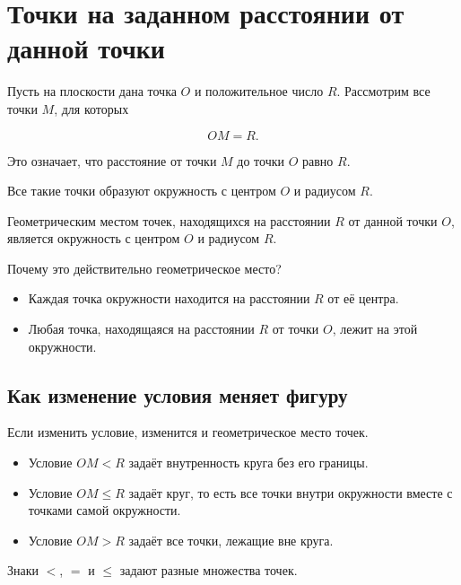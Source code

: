 	\section{Точки на заданном расстоянии от данной точки}
	
	Пусть на плоскости дана точка \(O\) и положительное число \(R\).
	Рассмотрим все точки \(M\), для которых
	
	\[
	OM=R.
	\]
	
	Это означает, что расстояние от точки \(M\) до точки \(O\) равно \(R\).
	
	Все такие точки образуют окружность с центром \(O\) и радиусом \(R\).
	
	\begin{propertybox}
		Геометрическим местом точек, находящихся на расстоянии \(R\)
		от данной точки \(O\), является окружность с центром \(O\)
		и радиусом \(R\).
	\end{propertybox}
	
	Почему это действительно геометрическое место?
	
	\begin{itemize}
		\item Каждая точка окружности находится на расстоянии \(R\) от её центра.
		\item Любая точка, находящаяся на расстоянии \(R\) от точки \(O\),
		лежит на этой окружности.
	\end{itemize}
	
	\subsection{Как изменение условия меняет фигуру}
	
	Если изменить условие, изменится и геометрическое место точек.

	\gmtdistancecomparisonfigure
	
	\begin{itemize}
			\item Условие \(OM<R\) задаёт внутренность круга без его границы.
		\item Условие \(OM\leq R\) задаёт круг, то есть все точки внутри окружности
		вместе с точками самой окружности.
		\item Условие \(OM>R\) задаёт все точки, лежащие вне круга.
	\end{itemize}
	
	\begin{attentionbox}
		Знаки \(<\), \(=\) и \(\leq\) задают разные множества точек.
	\end{attentionbox}
	
